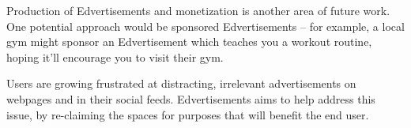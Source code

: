 \documentclass{sigchi}
\begin{document}
Production of Edvertisements and monetization is another area of future work. One potential approach would be sponsored Edvertisements -- for example, a local gym might sponsor an Edvertisement which teaches you a workout routine, hoping it'll encourage you to visit their gym.

Users are growing frustrated at distracting, irrelevant advertisements on webpages and in their social feeds. Edvertisements aims to help address this issue, by re-claiming the spaces for purposes that will benefit the end user.







\end{document}
